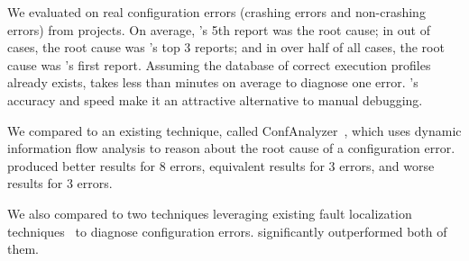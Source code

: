 We evaluated \ourtool on \errors real configuration errors
(\crash crashing errors and \noncrash non-crashing errors)
from \subjectnum projects.
On average, \ourtool's 5th report was the root cause; in
\topnum out of \errors cases, the root cause was \ourtool's
top 3 reports; and in over half of all
cases, the root cause was \ourtool's first report.
Assuming the database of correct execution profiles already exists,
\ourtool takes less than \avgtime minutes on average to diagnose
one error.  \ourtool's accuracy and speed make it an attractive alternative
to manual debugging.


We compared \ourtool to an existing technique, called ConfAnalyzer~\cite{Rabkin:2011:PPC},
which uses dynamic information flow analysis to reason about the root cause of a
configuration error. \ourtool produced better results for 8 errors,
equivalent results for 3 errors, and worse results for 3 errors.


We also compared \ourtool to two techniques leveraging
existing fault localization techniques~\cite{Jones:2002, McCamant:2003}
to diagnose configuration errors. 
\ourtool significantly outperformed both of them.





